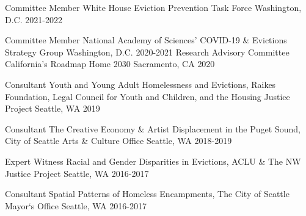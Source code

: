 
\begin{cvhonors}

  \cvhonor
    {Committee Member} %
    {White House Eviction Prevention Task Force} %
    {Washington, D.C.} %
    {2021-2022} %
    
  \cvhonor
    {Committee Member} %
    {National Academy of Sciences' COVID-19 \& Evictions Strategy Group} %
    {Washington, D.C.} %
    {2020-2021} %
  \cvhonor
    {Research Advisory Committee} %
    {California's Roadmap Home 2030} %
    {Sacramento, CA} %
    {2020} %
    
  \cvhonor
    {Consultant} %
    {Youth and Young Adult Homelessness and Evictions, Raikes Foundation, Legal Council for Youth and Children, and the Housing Justice Project} %
    {Seattle, WA} %
    {2019} %

  \cvhonor
    {Consultant} %
    {The Creative Economy \& Artist Displacement in the Puget Sound, City of Seattle Arts \& Culture Office} %
    {Seattle, WA} %
    {2018-2019} %

  \cvhonor
    {Expert Witness} %
    {Racial and Gender Disparities in Evictions, ACLU \& The NW Justice Project} %
    {Seattle, WA} %
    {2016-2017} %

  \cvhonor
    {Consultant} %
    {Spatial Patterns of Homeless Encampments, The City of Seattle Mayor‘s Office} %
    {Seattle, WA} %
    {2016-2017} %

\end{cvhonors}